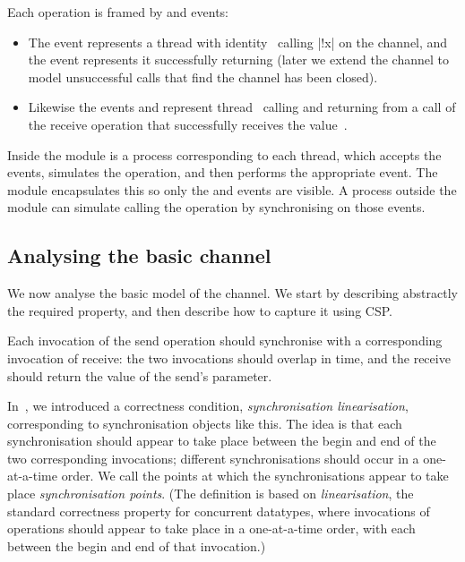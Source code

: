 Each operation is framed by  and  events:
%
\begin{itemize}
\item The event  represents a thread with
  identity~ calling |!x| on the channel, and the event
   represents it successfully returning (later we
  extend the channel to model unsuccessful calls that find the channel has
  been closed).

\item Likewise the events  and
   represent thread~ calling and
  returning from a call of the receive operation that successfully receives
  the value~.
\end{itemize}
%
Inside the module is a process corresponding to each thread, which accepts the
 events, simulates the operation, and then performs
the appropriate  event.  The module encapsulates this so only the
 and  events are visible.  A process outside the module
can simulate calling the operation by synchronising on those events.


\subsection{Analysing the basic channel}

We now analyse the basic model of the channel.  We start by describing
abstractly the required property, and then describe how to capture it using
CSP.

Each invocation of the send operation should synchronise with a corresponding
invocation of receive: the two invocations should overlap in time, and
the receive should return the value of the send's parameter.  

In~\cite{LL:synchronisation}, we introduced a correctness condition,
\emph{synchronisation linearisation}, corresponding to synchronisation objects
like this.  The idea is that each synchronisation should appear to take place
between the begin and end of the two corresponding invocations; different
synchronisations should occur in a one-at-a-time order.  We call the points at
which the synchronisations appear to take place \emph{synchronisation points}.
(The definition is based on \emph{linearisation}, the standard correctness
property for concurrent datatypes, where invocations of operations should
appear to take place in a one-at-a-time order, with each between the begin and
end of that invocation.)

